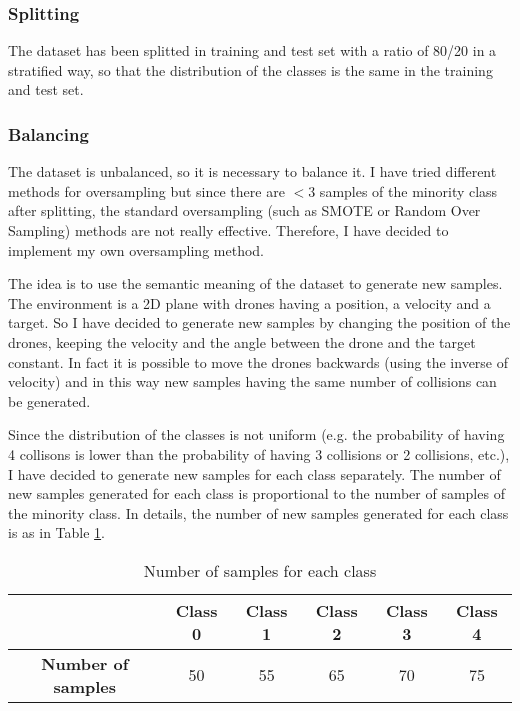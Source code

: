 \subsubsection{Splitting}
\label{sec:preprocessing-splitting}
The dataset has been splitted in training and test set with a ratio of 80/20 in a stratified way, so that the distribution of the classes is the same in the training and test set.

\subsubsection{Balancing}
\label{sec:preprocessing-balancing}
The dataset is unbalanced, so it is necessary to balance it.
I have tried different methods for oversampling but since there are $<3$ samples of the minority class after splitting, the standard oversampling (such as SMOTE or Random Over Sampling) methods are not really effective.
Therefore, I have decided to implement my own oversampling method.

The idea is to use the semantic meaning of the dataset to generate new samples.
The environment is a 2D plane with drones having a position, a velocity and a target.
So I have decided to generate new samples by changing the position of the drones, keeping the velocity and the angle between the drone and the target constant.
In fact it is possible to move the drones backwards (using the inverse of velocity) and in this way new samples having the same number of collisions can be generated.

Since the distribution of the classes is not uniform (e.g. the probability of having 4 collisons is lower than the probability of having 3 collisions or 2 collisions, etc.), I have decided to generate new samples for each class separately.
The number of new samples generated for each class is proportional to the number of samples of the minority class.
In details, the number of new samples generated for each class is as in Table \ref{tab:preprocessing-balancing}.
\begin{table}[h]
    \centering
    \begin{tabular}{|c|c|c|c|c|c|}
        \hline
        & \textbf{Class 0} & \textbf{Class 1} & \textbf{Class 2} & \textbf{Class 3} & \textbf{Class 4} \\ \hline
        \textbf{Number of samples} & 50 & 55 & 65 & 70 & 75 \\ \hline
    \end{tabular}
    \caption{Number of samples for each class}
    \label{tab:preprocessing-balancing}
\end{table}

